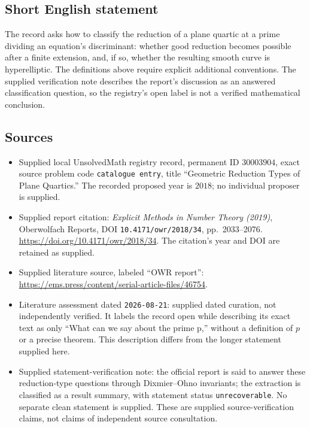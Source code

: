 \documentclass[11pt]{article}
\begin{document}
\subsection{Short English statement}
The record asks how to classify the reduction of a plane quartic at a prime dividing an equation's discriminant: whether good reduction becomes possible after a finite extension, and, if so, whether the resulting smooth curve is hyperelliptic. The definitions above require explicit additional conventions. The supplied verification note describes the report's discussion as an answered classification question, so the registry's open label is not a verified mathematical conclusion.
\subsection{Sources}
\begin{itemize}
\item Supplied local UnsolvedMath registry record, permanent ID \(30003904\), exact source problem code \texttt{catalogue entry}, title ``Geometric Reduction Types of Plane Quartics.'' The recorded proposed year is \(2018\); no individual proposer is supplied.
\item Supplied report citation: \emph{Explicit Methods in Number Theory (2019)}, Oberwolfach Reports, DOI \texttt{10.4171/owr/2018/34}, pp.\ 2033--2076. \url{https://doi.org/10.4171/owr/2018/34}. The citation's year and DOI are retained as supplied.
\item Supplied literature source, labeled ``OWR report'': \url{https://ems.press/content/serial-article-files/46754}.
\item Literature assessment dated \texttt{2026-08-21}: supplied dated curation, not independently verified. It labels the record open while describing its exact text as only ``What can we say about the prime p,'' without a definition of \(p\) or a precise theorem. This description differs from the longer statement supplied here.
\item Supplied statement-verification note: the official report is said to answer these reduction-type questions through Dixmier--Ohno invariants; the extraction is classified as a result summary, with statement status \texttt{unrecoverable}. No separate clean statement is supplied. These are supplied source-verification claims, not claims of independent source consultation.
\end{itemize}
\end{document}
